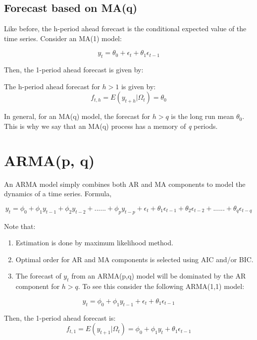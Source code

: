 \documentclass[]{book}
\theoremstyle{definition}
\theoremstyle{definition}
\theoremstyle{definition}
\theoremstyle{remark}
\begin{document}
\hypertarget{forecast-based-on-maq}{%
\subsection{Forecast based on MA(q)}\label{forecast-based-on-maq}}

Like before, the h-period ahead forecast is the conditional expected
value of the time series. Consider an MA(1) model:

\[y_t=\theta_0 +\epsilon_t + \theta_1 \epsilon_{t-1}\]

Then, the 1-period ahead forecast is given by:

The h-period ahead forecast for \(h>1\) is given by:
\[f_{t,h}=E(y_{t+h}|\Omega_t)=\theta_0\]

In general, for an MA(q) model, the forecast for \(h>q\) is the long run
mean \(\theta_0\). This is why we say that an MA(q) process has a memory
of \emph{q} periods.

\hypertarget{armap-q}{%
\section{ARMA(p, q)}\label{armap-q}}

An ARMA model simply combines both AR and MA components to model the
dynamics of a time series. Formula,

\begin{equation}
   y_t = \phi_0 +\phi_1 y_{t-1} + \phi_2 y_{t-2} + ...... + \phi_p y_{t-p}+\epsilon_t + \theta_1 \epsilon_{t-1} + \theta_2 \epsilon_{t-2} + ...... + \theta_q \epsilon_{t-q}
   \end{equation}

Note that:

\begin{enumerate}
\def\labelenumi{\arabic{enumi}.}
\item
  Estimation is done by maximum likelihood method.
\item
  Optimal order for AR and MA components is selected using AIC and/or
  BIC.
\item
  The forecast of \(y_t\) from an ARMA(p,q) model will be dominated by
  the AR component for \(h>q\). To see this consider the following
  ARMA(1,1) model:
\end{enumerate}

\[y_t = \phi_0 +\phi_1 y_{t-1}+ \epsilon_t + \theta_1 \epsilon_{t-1}\]

Then, the 1-period ahead forecast is:
\[f_{t,1} = E(y_{t+1}|\Omega_t) = \phi_0 + \phi_1 y_t + \theta_1 \epsilon_{t-1}\]
\end{document}
